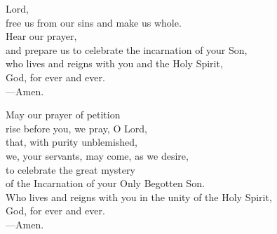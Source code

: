 \prayer


\begin{prayerverse}
Lord,\\
free us from our sins and make us whole.\\
Hear our prayer,\\
and prepare us to celebrate the incarnation of your Son,\\
who lives and reigns with you and the Holy Spirit,\\
God, for ever and ever.\\
{\color{red}---\thinspace}Amen.
\end{prayerverse}


\begin{prayerverse}
May our prayer of petition\\
rise before you, we pray, O Lord,\\
that, with purity unblemished,\\
we, your servants, may come, as we desire,\\
to celebrate the great mystery\\
of the Incarnation of your Only Begotten Son.\\
Who lives and reigns with you in the unity of the Holy Spirit,\\
God, for ever and ever.\\
{\color{red}---\thinspace}Amen.
\end{prayerverse}

